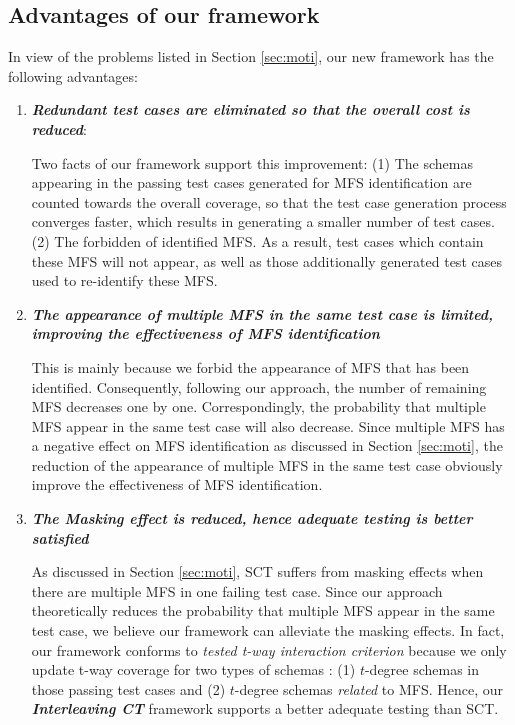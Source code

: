\documentclass[10pt,journal,compsoc]{IEEEtran}
\begin{document}
\subsection{Advantages of our framework}\label{sec:app:advan}
In view of the problems listed in Section \ref{sec:moti},  our new framework has the following advantages:
 \begin{enumerate}
\item \emph{\textbf{Redundant test cases are eliminated so that the overall cost is reduced}}:

Two facts of our framework support this improvement: (1) The schemas appearing in the passing test cases generated for MFS identification are counted towards the overall coverage, so that the test case generation process converges faster, which results in generating a smaller number of test cases. (2) The forbidden of identified MFS. As a result, test cases which contain these MFS will not appear, as well as those additionally generated test cases used to re-identify these MFS.

\item \emph{\textbf{The appearance of multiple MFS in the same test case is limited, improving the effectiveness of MFS identification}}

This is mainly because we forbid the appearance of MFS that has been identified. Consequently, following our approach, the number of remaining MFS decreases one by one. Correspondingly, the probability that multiple MFS appear in the same test case will also decrease. Since multiple MFS has a negative effect on MFS identification as discussed in Section \ref{sec:moti}, the reduction of the appearance of multiple MFS in the same test case obviously improve the effectiveness of MFS identification.

\item \emph{\textbf{The Masking effect is reduced, hence adequate testing is better satisfied}}

As discussed in Section \ref{sec:moti}, SCT suffers from masking effects when there are multiple MFS in one failing test case. Since our approach theoretically reduces the probability that multiple MFS appear in the same test case, we believe our framework can alleviate the masking effects. In fact, our framework conforms to \emph{tested t-way interaction criterion} because we only update t-way coverage for two types of schemas : (1) $t$-degree schemas in those passing test cases and (2) $t$-degree schemas \emph{related} to MFS. Hence, our \emph{\textbf{Interleaving CT}} framework supports a better adequate testing than SCT.



\end{enumerate}
\end{document}
